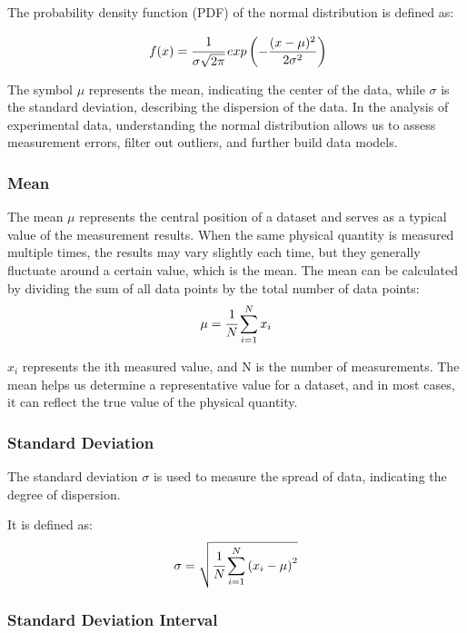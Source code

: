 \documentclass[12pt,a4paper]{article}
\begin{document}
\begin{CJK}{UTF8}{bkai}
The probability density function (PDF) of the normal distribution is defined as:

\begin{equation}
    \ f(x)= \cfrac{1}{\sigma\sqrt{2\pi}}\,exp\left({-\frac{(x-\mu)^2}{2\sigma^2}}\right)
\end{equation}

The symbol $\mu$ represents the mean, indicating the center of the data, while $\sigma$ is the standard deviation, describing the dispersion of the data. In the analysis of experimental data, understanding the normal distribution allows us to assess measurement errors, filter out outliers, and further build data models.

\subsubsection{Mean}
\hfill

The mean $\mu$ represents the central position of a dataset and serves as a typical value of the measurement results. When the same physical quantity is measured multiple times, the results may vary slightly each time, but they generally fluctuate around a certain value, which is the mean.
The mean can be calculated by dividing the sum of all data points by the total number of data points:
\begin{equation}
     \mu= \cfrac{1}{N}\sum_{i=1}^{N}x_i
\end{equation}

$x_i$ represents the ith measured value, and N is the number of measurements.
The mean helps us determine a representative value for a dataset, and in most cases, it can reflect the true value of the physical quantity.


\subsubsection{Standard Deviation}
\hfill

The standard deviation $\sigma$ is used to measure the spread of data, indicating the degree of dispersion.

It is defined as:
\begin{equation}
     \sigma = \sqrt{\cfrac{1}{N}\sum_{i=1}^{N}{\left(x_i-\mu\right)^2}}
\end{equation}

\subsubsection{Standard Deviation Interval}
\hfill


\end{CJK}
\end{document}
